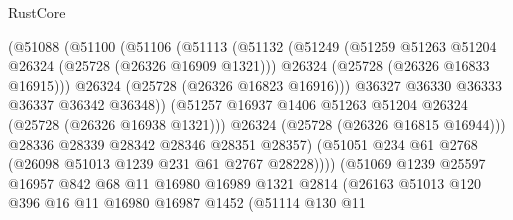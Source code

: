 \begin{lexlean}{RustCore}
\begin{coremodule}
                              (@51088
                                (@51100
                                  (@51106
                                    (@51113
                                      (@51132
                                        (@51249
                                          (@51259
                                            @51263
                                            @51204
                                            @26324
                                            (@25728 (@26326 @16909 @1321)))
                                          @26324
                                          (@25728 (@26326 @16833 @16915)))
                                        @26324
                                        (@25728 (@26326 @16823 @16916)))
                                      @36327
                                      @36330
                                      @36333
                                      @36337
                                      @36342
                                      @36348))
                                  (@51257
                                    @16937
                                    @1406
                                    @51263
                                    @51204
                                    @26324
                                    (@25728 (@26326 @16938 @1321)))
                                  @26324
                                  (@25728 (@26326 @16815 @16944)))
                                @28336
                                @28339
                                @28342
                                @28346
                                @28351
                                @28357)
                              (@51051 @234 @61 @2768 (@26098 @51013 @1239 @231 @61 @2767 @28228))))
                          (@51069
                            @1239
                            @25597
                            @16957
                            @842
                            @68
                            @11
                            @16980
                            @16989
                            @1321
                            @2814
                            (@26163
                              @51013
                              @120
                              @396
                              @16
                              @11
                              @16980
                              @16987
                              @1452
                              (@51114
                                @130
                                @11

\end{coremodule}
\end{lexlean}
